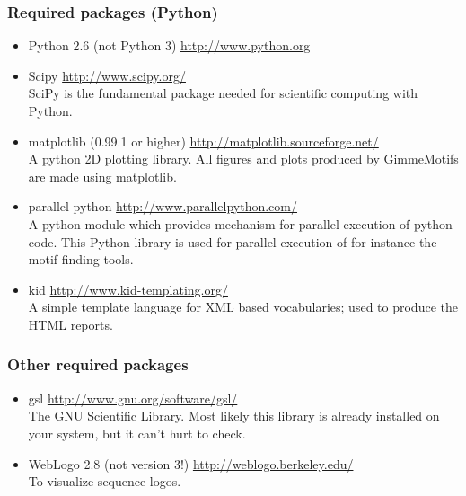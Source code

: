 \documentclass[10pt]{article}
\begin{document}
\subsubsection{Required packages (Python)}
\begin{itemize}
\item Python 2.6 (not Python 3) \url{http://www.python.org}
\item Scipy \url{http://www.scipy.org/} \\
SciPy is the fundamental package needed for scientific computing with Python. 
\item matplotlib (0.99.1 or higher) \url{http://matplotlib.sourceforge.net/} \\
A python 2D plotting library. All figures and plots produced by GimmeMotifs are made using matplotlib.
\item parallel python \url{http://www.parallelpython.com/} \\
A python module which provides mechanism for parallel execution of python code. This Python library is used for parallel execution of for instance the motif finding tools. 
\item kid \url{http://www.kid-templating.org/} \\
A simple template language for XML based vocabularies; used to produce the HTML reports.
\end{itemize}

\subsubsection{Other required packages}
\begin{itemize}

 \item gsl \url{http://www.gnu.org/software/gsl/} \\
The GNU Scientific Library. 
Most likely this library is already installed on your system, but it can't hurt to check.
 \item WebLogo 2.8 (not version 3!) \url{http://weblogo.berkeley.edu/} \\
To visualize sequence logos.
\end{itemize}
\end{document}
